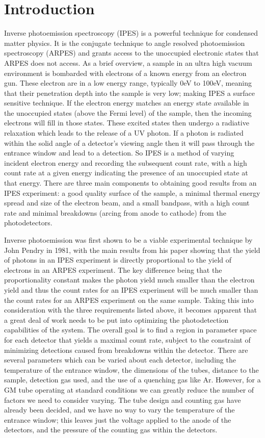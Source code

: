 \section{Introduction}
Inverse photoemission spectroscopy (IPES) is a powerful technique for condensed matter physics. It is the conjugate technique to angle resolved photoemission spectroscopy (ARPES)
and grants access to the unoccupied electronic states that ARPES does not access. As a brief overview, a sample in an ultra high vacuum environment is bombarded with
electrons of a known energy from an electron gun. These electron are in a low energy range, typically 0eV to 100eV, meaning that their penetration depth into the sample is very low; making
IPES a surface sensitive technique. If the electron energy matches an energy state available in the unoccupied states (above the Fermi level) of the sample, then the 
incoming electrons will fill in those states. These excited states then undergo a radiative relaxation which leads to the release of a UV photon. If a photon is radiated within the
solid angle of a detector's viewing angle then it will pass through the entrance window and lead to a detection. So IPES is a method of varying incident electron energy and recording
the subsequent count rate, with a high count rate at a given energy indicating the presence of an unoccupied state at that energy. There are three main components to obtaining good 
results from an IPES experiment: a good quality surface of the sample, a minimal thermal energy spread and size of the electron beam, and a small bandpass, with a high count rate and 
minimal breakdowns (arcing from anode to cathode) from the photodetectors. 

Inverse photoemission was first shown to be a viable experimental technique by John Pendry in 1981\cite{pendry1981theory}, with the main results from his paper showing that the yield of photons in an IPES
experiment is directly proportional to the yield of electrons in an ARPES experiment. The key difference being that the proportionality constant makes the photon yield much smaller 
than the electron yield and thus the count rates for an IPES experiment will be much smaller than the count rates for an ARPES experiment on the same sample. Taking this into consideration
with the three requirements listed above, it becomes apparent that a great deal of work needs to be put into optimizing the photodetection capabilities of the system. The overall goal
is to find a region in parameter space for each detector that yields a maximal count rate, subject to the constraint of minimizing detections caused from breakdowns within the detector. 
There are several parameters which can be varied about each detector, including the temperature of the entrance window, the dimensions of the tubes, distance to the sample, detection gas used, 
and the use of a quenching gas like Ar. However, for a GM tube operating at standard conditions we can greatly reduce the number of factors we need to consider varying. The tube 
design and counting gas have already been decided, and we have no way to vary the temperature of the entrance window; this leaves just the voltage applied to the anode of the detectors, 
and the pressure of the counting gas within the detectors. 

